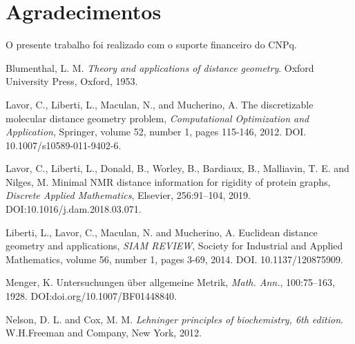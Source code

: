 \documentclass[a4,11pt]{pssbmac}
\begin{document}
	\vspace{-0.14cm}
	\section*{Agradecimentos}
	O presente trabalho foi realizado com o suporte financeiro do CNPq.
	
	\begin{thebibliography}{00}
		
		Blumenthal, L. M. {\it Theory and applications of distance geometry}.  Oxford University Press, Oxford, 1953.
		
		
		Lavor, C., Liberti, L., Maculan, N., and Mucherino, A. The discretizable molecular distance geometry problem, {\it Computational Optimization and Application}, Springer,  volume 52, number 1, pages 115-146, 2012. DOI. 10.1007/s10589-011-9402-6.
		
		Lavor, C., Liberti, L., Donald, B., Worley, B., Bardiaux, B., Malliavin, T. E. and Nilges, M. Minimal NMR distance information for rigidity of protein graphs, {\it Discrete Applied Mathematics}, Elsevier, 256:91--104, 2019. DOI:10.1016/j.dam.2018.03.071.
		
		
		Liberti, L., Lavor, C., Maculan, N. and Mucherino, A. Euclidean distance geometry and applications, {\it SIAM REVIEW}, Society for Industrial and Applied Mathematics,  volume 56, number 1, pages 3-69, 2014. DOI. 10.1137/120875909.
		
		Menger, K. Untersuchungen über allgemeine Metrik, {\it Math. Ann.},  100:75--163, 1928. DOI:doi.org/10.1007/BF01448840.
		
		Nelson, D. L. and Cox, M. M. {\it Lehninger principles of biochemistry, 6th edition}.  W.H.Freeman and Company, New York, 2012.
		

\end{thebibliography}
\end{document}

